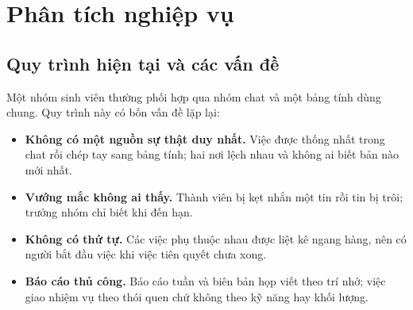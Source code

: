 \documentclass[../main.tex]{subfiles}
\begin{document}
\section{Phân tích nghiệp vụ}
\subsection{Quy trình hiện tại và các vấn đề}
Một nhóm sinh viên thường phối hợp qua nhóm chat và một bảng tính dùng chung. Quy trình này có bốn
vấn đề lặp lại:
\begin{itemize}
  \item \textbf{Không có một nguồn sự thật duy nhất.} Việc được thống nhất trong chat rồi chép tay
        sang bảng tính; hai nơi lệch nhau và không ai biết bản nào mới nhất.
  \item \textbf{Vướng mắc không ai thấy.} Thành viên bị kẹt nhắn một tin rồi tin bị trôi; trưởng
        nhóm chỉ biết khi đến hạn.
  \item \textbf{Không có thứ tự.} Các việc phụ thuộc nhau được liệt kê ngang hàng, nên có người bắt
        đầu việc khi việc tiên quyết chưa xong.
  \item \textbf{Báo cáo thủ công.} Báo cáo tuần và biên bản họp viết theo trí nhớ; việc giao nhiệm vụ
        theo thói quen chứ không theo kỹ năng hay khối lượng.
\end{itemize}
\end{document}
